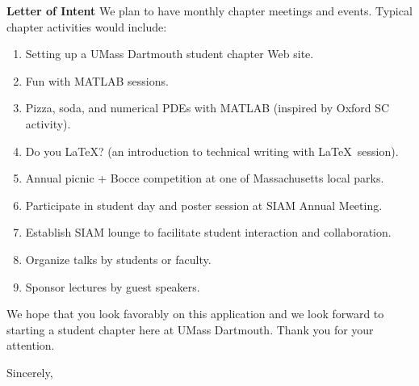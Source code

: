 \documentclass[letterpaper,12pt]{letter}
\begin{document}
\begin{letter}{\textbf{Letter of Intent}}
                                                                        We plan to have monthly chapter meetings and events. Typical chapter activities would include:
                                                                        \begin{enumerate}
                                                                        \item Setting up a UMass Dartmouth student chapter Web site.
                                                                        \item Fun with \textsc{MATLAB} sessions.
                                                                        \item Pizza, soda, and numerical PDEs with \textsc{MATLAB} (inspired by Oxford SC activity).
                                                                        \item Do you \LaTeX ? (an introduction to technical writing with \LaTeX\ session).
                                                                        \item Annual picnic + Bocce competition at one of Massachusetts local parks.
                                                                        \newpage
                                                                        \item Participate in student day and poster session at SIAM Annual Meeting. 
                                                                        \item Establish SIAM lounge to facilitate student interaction and collaboration.
                                                                        \item Organize talks by students or faculty.
                                                                        \item Sponsor lectures by guest speakers.
                                                                        \end{enumerate}

                                                                        We hope that you look favorably on this application and we look forward to starting a student chapter here at UMass Dartmouth. Thank you for your attention.

                                                                        \closing{Sincerely,}

                                                                        \end{letter}

                                                                        
\end{document}
